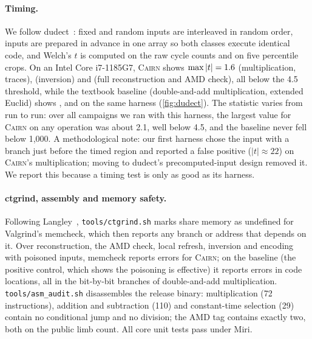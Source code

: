 \documentclass[10.5pt,a4paper]{article}
\theoremstyle{plain}
\theoremstyle{definition}
\newcommand{\cairn}{\textsc{Cairn}}
\newcommand{\code}[1]{\texttt{#1}}
\begin{document}
\paragraph{Timing.} We follow dudect~\cite{reparaz17}: fixed and random inputs are interleaved in random order, inputs are prepared in advance in one array so both classes execute identical code, and Welch's $t$ is computed on the raw cycle counts and on five percentile crops. On an Intel Core i7-1185G7, \cairn{} shows $\max|t|=1.6$ (multiplication, \SamplesMulCairn{} traces), \DudectInvCairn{} (inversion) and \DudectRecCairn{} (full reconstruction and AMD check), all below the 4.5 threshold, while the textbook baseline (double-and-add multiplication, extended Euclid) shows \DudectMulNaive{}, \DudectInvNaive{} and \DudectRecNaive{} on the same harness (\cref{fig:dudect}). The statistic varies from run to run: over all campaigns we ran with this harness, the largest value for \cairn{} on any operation was about 2.1, well below 4.5, and the baseline never fell below 1{,}000. A methodological note: our first harness chose the input with a branch just before the timed region and reported a false positive ($|t|\approx22$) on \cairn{}'s multiplication; moving to dudect's precomputed-input design removed it. We report this because a timing test is only as good as its harness.

\paragraph{ctgrind, assembly and memory safety.} Following Langley~\cite{langley10}, \code{tools/ctgrind.sh} marks share memory as undefined for Valgrind's memcheck, which then reports any branch or address that depends on it. Over reconstruction, the AMD check, local refresh, inversion and encoding with poisoned inputs, memcheck reports \CtgrindCairn{} errors for \cairn{}; on the baseline (the positive control, which shows the poisoning is effective) it reports \CtgrindNaive{} errors in \CtgrindNaiveContexts{} code locations, all in the bit-by-bit branches of double-and-add multiplication. \code{tools/asm\_audit.sh} disassembles the release binary: multiplication (72 instructions), addition and subtraction (110) and constant-time selection (29) contain no conditional jump and no division; the AMD tag contains exactly two, both on the public limb count. All core unit tests pass under Miri.
\end{document}

